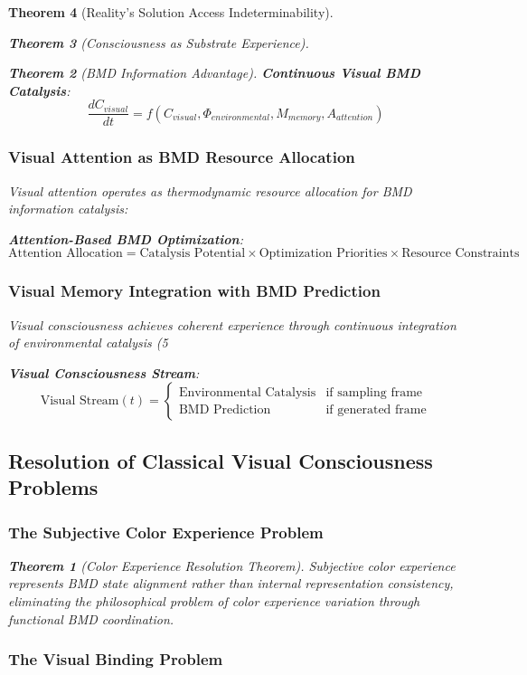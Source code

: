 \documentclass[12pt,a4paper]{article}
\newtheorem{theorem}{Theorem}[section]
\theoremstyle{remark}
\begin{document}
\begin{theorem}[Reality's Solution Access Indeterminability]
\begin{theorem}[Consciousness as Substrate Experience]
\begin{theorem}[BMD Information Advantage]
{\textbf{Continuous Visual BMD Catalysis}:
$$\frac{dC_{visual}}{dt} = f(C_{visual}, \Phi_{environmental}, M_{memory}, A_{attention})$$

\subsubsection{Visual Attention as BMD Resource Allocation}

Visual attention operates as thermodynamic resource allocation for BMD information catalysis:

\textbf{Attention-Based BMD Optimization}:
$$\text{Attention Allocation} = \text{Catalysis Potential} \times \text{Optimization Priorities} \times \text{Resource Constraints}$$

\subsubsection{Visual Memory Integration with BMD Prediction}

Visual consciousness achieves coherent experience through continuous integration of environmental catalysis (5%

\textbf{Visual Consciousness Stream}:
$$\text{Visual Stream}(t) = \begin{cases}
\text{Environmental Catalysis} & \text{if sampling frame} \\
\text{BMD Prediction} & \text{if generated frame}
\end{cases}$$

\subsection{Resolution of Classical Visual Consciousness Problems}

\subsubsection{The Subjective Color Experience Problem}

\begin{theorem}[Color Experience Resolution Theorem]
Subjective color experience represents BMD state alignment rather than internal representation consistency, eliminating the philosophical problem of color experience variation through functional BMD coordination.
\end{theorem}

\subsubsection{The Visual Binding Problem}

}
\end{theorem}
\end{theorem}
\end{theorem}
\end{document}
